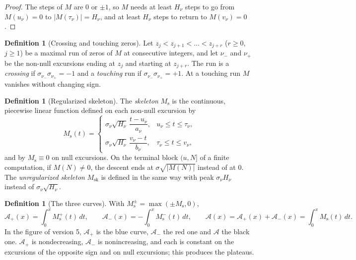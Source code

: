 \documentclass[11pt]{amsart}
\numberwithin{equation}{section}
\theoremstyle{plain}
\theoremstyle{definition}
\newtheorem{definition}[theorem]{Definition}
\theoremstyle{remark}
\newcommand{\Ms}{M_{\mathrm{s}}}
\newcommand{\Msk}{M_{\mathrm{sk}}}
\newcommand{\Ap}{\mathcal{A}_{+}}
\newcommand{\Am}{\mathcal{A}_{-}}
\newcommand{\Anet}{\mathcal{A}}
\begin{document}
\begin{proof}
The steps of $M$ are $0$ or $\pm1$, so $M$ needs at least $H_\nu$ steps to
go from $M(u_\nu)=0$ to $|M(\tau_\nu)|=H_\nu$, and at least $H_\nu$ steps to
return to $M(v_\nu)=0$.
\end{proof}

\begin{definition}[Crossing and touching zeros]
\label{def:crossing_touching}
Let $z_j<z_{j+1}<\dots<z_{j+r}$ ($r\ge0$, $j\ge1$) be a maximal run of zeros
of $M$ at consecutive integers, and let $\nu_-$ and $\nu_+$ be the non-null
excursions ending at $z_j$ and starting at $z_{j+r}$. The run is a
\emph{crossing} if $\sigma_{\nu_-}\sigma_{\nu_+}=-1$ and a \emph{touching}
run if $\sigma_{\nu_-}\sigma_{\nu_+}=+1$. At a touching run $M$ vanishes
without changing sign.
\end{definition}

\begin{definition}[Regularized skeleton]
\label{def:Ms}
The \emph{skeleton} $\Ms$ is the continuous, piecewise linear function
defined on each non-null excursion by
\begin{equation}
\label{eq:Ms_def}
  \Ms(t)=
  \begin{cases}
    \sigma_\nu\sqrt{H_\nu}\,\dfrac{t-u_\nu}{a_\nu}, & u_\nu\le t\le \tau_\nu,\\[2ex]
    \sigma_\nu\sqrt{H_\nu}\,\dfrac{v_\nu-t}{b_\nu}, & \tau_\nu\le t\le v_\nu ,
  \end{cases}
\end{equation}
and by $\Ms\equiv0$ on null excursions. On the terminal block $(u,N]$ of a
finite computation, if $M(N)\neq0$, the descent ends at
$\sigma\sqrt{|M(N)|}$ instead of at $0$. The \emph{unregularized skeleton}
$\Msk$ is defined in the same way with peak $\sigma_\nu H_\nu$ instead of
$\sigma_\nu\sqrt{H_\nu}$.
\end{definition}

\begin{definition}[The three curves]
\label{def:areas}
With $\Ms^{\pm}=\max(\pm \Ms,0)$,
\begin{equation}
\label{eq:areas_def}
  \Ap(x)=\int_0^x \Ms^{+}(t)\,dt,\qquad
  \Am(x)=-\int_0^x \Ms^{-}(t)\,dt,\qquad
  \Anet(x)=\Ap(x)+\Am(x)=\int_0^x \Ms(t)\,dt .
\end{equation}
In the figure of version 5, $\Ap$ is the blue curve, $\Am$ the red one and
$\Anet$ the black one. $\Ap$ is nondecreasing, $\Am$ is nonincreasing, and
each is constant on the excursions of the opposite sign and on null
excursions; this produces the plateaus.
\end{definition}
\end{document}
